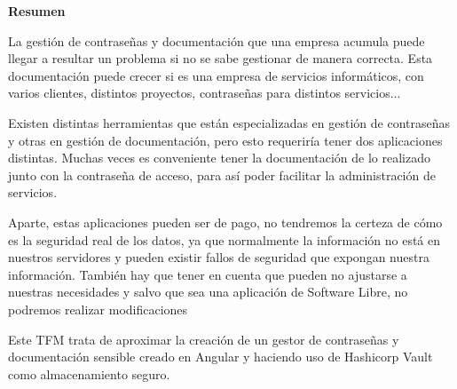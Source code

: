 \documentclass{\ClassPath/viu-tfm-template}
\begin{document}
\graphicspath{{../VIU_TFM_LaTeX_template/}}

\coverpage




\vspace*{\fill}
\begin{center}
    \textbf{Resumen}
\end{center}

La gestión de contraseñas y documentación que una empresa acumula puede llegar a resultar un problema si no se sabe gestionar de manera correcta. Esta documentación puede crecer si es una empresa de servicios informáticos, con varios clientes, distintos proyectos, contraseñas para distintos servicios...

Existen distintas herramientas que están especializadas en gestión de contraseñas y otras en gestión de documentación, pero esto requeriría tener dos aplicaciones distintas. Muchas veces es conveniente tener la documentación de lo realizado junto con la contraseña de acceso, para así poder facilitar la administración de servicios.

Aparte, estas aplicaciones pueden ser de pago, no tendremos la certeza de cómo es la seguridad real de los datos, ya que normalmente la información no está en nuestros servidores y pueden existir fallos de seguridad que expongan nuestra información. También hay que tener en cuenta que pueden no ajustarse a nuestras necesidades y salvo que sea una aplicación de Software Libre, no podremos realizar modificaciones

Este TFM trata de aproximar la creación de un gestor de contraseñas y documentación sensible creado en Angular y haciendo uso de Hashicorp Vault como almacenamiento seguro.


\vspace*{\fill}
\vspace*{\fill}
\vspace*{\fill}

\pagebreak
\end{document}
